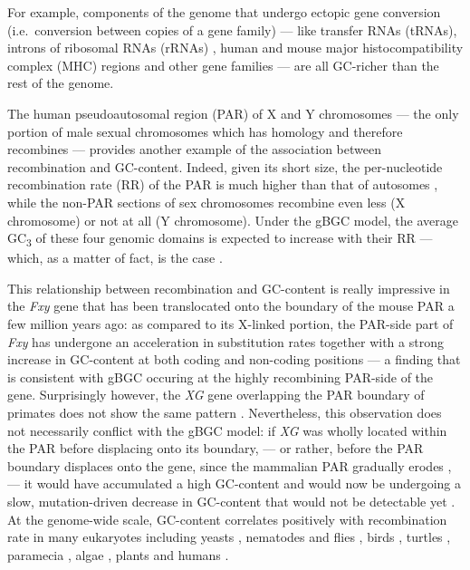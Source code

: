 For example, components of the genome that undergo ectopic gene conversion (i.e.\ conversion between copies of a gene family) — like transfer RNAs (tRNAs), introns of ribosomal RNAs (rRNAs) \citep{galtier2001gccontent}, human and mouse major histocompatibility complex (MHC) regions \citep{hogstrand1999gene} and other gene families \citep{backstrom2005gene,galtier2003gene,kudla2004gene} — are all GC-richer than the rest of the genome.

The human pseudoautosomal region (PAR) of X and Y chromosomes — the only portion of male sexual chromosomes which has homology and therefore recombines — provides another example of the association between recombination and GC-content.
Indeed, given its short size, the per-nucleotide recombination rate (RR) of the PAR is much higher than that of autosomes \citep{soriano1987high}, while the non-PAR sections of sex chromosomes recombine even less (X chromosome) or not at all (Y chromosome).
Under the gBGC model, the average GC\textsubscript{3} of these four genomic domains is expected to increase with their RR — which, as a matter of fact, is the case \citep{galtier2001gccontent}.

This relationship between recombination and GC-content is really impressive in the \textit{Fxy} gene that has been translocated onto the boundary of the mouse PAR a few million years ago: as compared to its X-linked portion, the PAR-side part of \textit{Fxy} has undergone an acceleration in substitution rates \citep{perry1999evolutionary} together with a strong increase in GC-content at both coding and non-coding positions \citep{montoya-burgos2003recombination,galtier2007adaptation} — a finding that is consistent with gBGC occuring at the highly recombining PAR-side of the gene.
Surprisingly however, the \textit{XG} gene overlapping the PAR boundary of primates does not show the same pattern \citep{yi2004recombination}.
Nevertheless, this observation does not necessarily conflict with the gBGC model: if \textit{XG} was wholly located within the PAR before displacing onto its boundary, — or rather, before the PAR boundary displaces onto the gene, since the mammalian PAR gradually erodes \citep{lahn1999four,marais2003sex}, — it would have accumulated a high GC-content and would now be undergoing a slow, mutation-driven decrease in GC-content that would not be detectable yet \citep{galtier2004recombination}.\\


At the genome-wide scale, GC-content correlates positively with recombination rate in many eukaryotes \citep{pessia2012evidence} including yeasts \citep{gerton2000global,birdsell2002integrating}, nematodes and flies \citep{marais2001does,marais2003neutral,marais2002hillrobertson}, birds \citep{internationalchickengenomesequencingconsortium2004sequence,mugal2013twisted}, turtles \citep{kuraku2006cdnabased}, paramecia \citep{duret2008analysis}, algae \citep{jancek2008clues}, plants \citep{glemin2006impact} and humans \citep{fullerton2001local,yu2001comparison,meunier2004recombination,khelifi2006gc,duret2008impact}.

